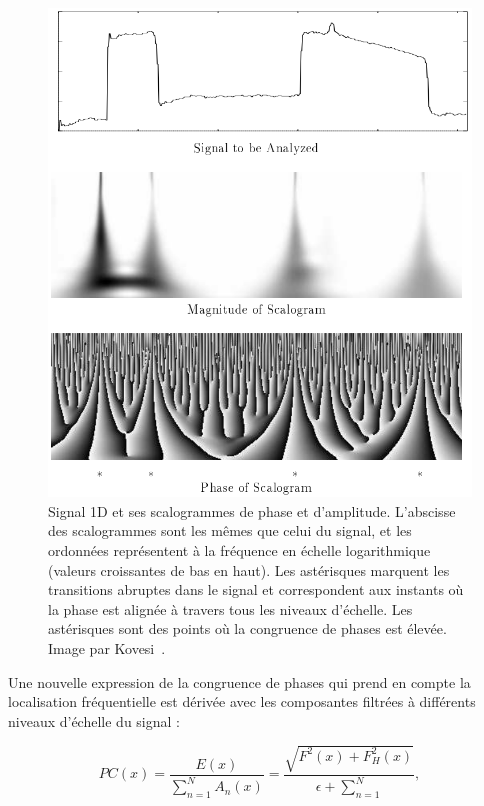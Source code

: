 \bigskip

\begin{figure}
    \centering
    \includegraphics[width=.85\textwidth]{contenu/resources/images/phase_congruence_scalogram}
    \caption[Scalogramme d'un signal mettant en évidence des points caractéristiques du signal]{Signal 1D et ses scalogrammes de phase et d'amplitude. L'abscisse des scalogrammes sont les mêmes que celui du signal, et les ordonnées représentent à la fréquence en échelle logarithmique (valeurs croissantes de bas en haut). Les astérisques marquent les transitions abruptes dans le signal et correspondent aux instants où la phase est alignée à travers tous les niveaux d'échelle. Les astérisques sont des points où la congruence de phases est élevée. Image par Kovesi~\cite{kovesi_image_1995}.}
    \label{fig:phase-congruence-scalogram}
\end{figure}

Une nouvelle expression de la congruence de phases qui prend en compte la localisation fréquentielle est dérivée avec les composantes filtrées à différents niveaux d'échelle du signal :

\begin{equation}
    PC(x) = \frac{E(x)}{\sum_{n=1}^{N} A_n(x)} = \frac{\sqrt{F^2(x)+F_H^2(x)}}{\epsilon + \sum_{n=1}^{N}},
\end{equation}

